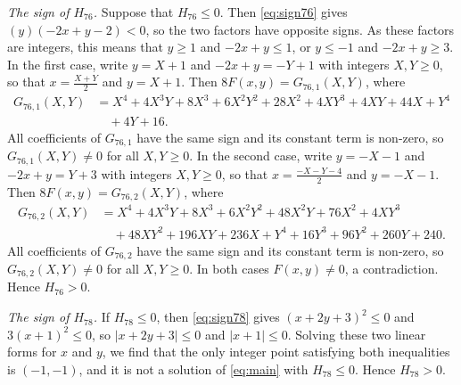 \documentclass[11pt]{article}
\begin{document}
\emph{The sign of $H_{76}$.} Suppose that $H_{76}\leq0$. Then \eqref{eq:sign76} gives $(y)(-2x+y-2)<0$, so the two factors have opposite signs. As these factors are integers, this means that $y\geq1$ and $-2x+y\leq1$, or $y\leq-1$ and $-2x+y\geq3$. In the first case, write $y=X+1$ and $-2x+y=-Y+1$ with integers $X,Y\geq0$, so that $x=\tfrac{X+Y}{2}$ and $y=X+1$. Then $8F(x,y)=G_{76,1}(X,Y)$, where
\begin{align*}
G_{76,1}(X,Y)&=X^{4}+4X^{3}Y+8X^{3}+6X^{2}Y^{2}+28X^{2}+4XY^{3}+4XY+44X+Y^{4}\\
&\quad+4Y+16.
\end{align*}
All coefficients of $G_{76,1}$ have the same sign and its constant term is non-zero, so $G_{76,1}(X,Y)\neq0$ for all $X,Y\geq0$. In the second case, write $y=-X-1$ and $-2x+y=Y+3$ with integers $X,Y\geq0$, so that $x=\tfrac{-X-Y-4}{2}$ and $y=-X-1$. Then $8F(x,y)=G_{76,2}(X,Y)$, where
\begin{align*}
G_{76,2}(X,Y)&=X^{4}+4X^{3}Y+8X^{3}+6X^{2}Y^{2}+48X^{2}Y+76X^{2}+4XY^{3}\\
&\quad+48XY^{2}+196XY+236X+Y^{4}+16Y^{3}+96Y^{2}+260Y+240.
\end{align*}
All coefficients of $G_{76,2}$ have the same sign and its constant term is non-zero, so $G_{76,2}(X,Y)\neq0$ for all $X,Y\geq0$. In both cases $F(x,y)\neq0$, a contradiction. Hence $H_{76}>0$.

\emph{The sign of $H_{78}$.} If $H_{78}\leq0$, then \eqref{eq:sign78} gives $(x+2y+3)^2\leq 0$ and $3(x+1)^2\leq 0$, so $|x+2y+3|\leq0$ and $|x+1|\leq0$. Solving these two linear forms for $x$ and $y$, we find that the only integer point satisfying both inequalities is $(-1,-1)$, and it is not a solution of \eqref{eq:main} with $H_{78}\leq0$. Hence $H_{78}>0$.
\end{document}
